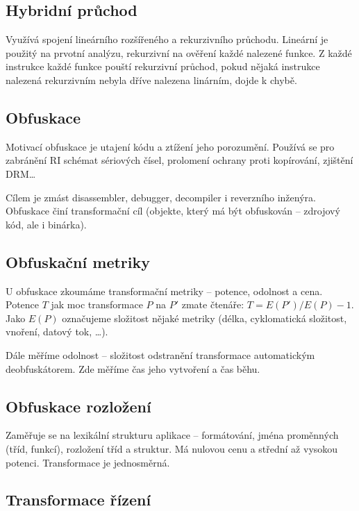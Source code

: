\subsection*{Hybridní průchod}

Využívá spojení lineárního rozšířeného a rekurzivního průchodu.
Lineární je použitý na prvotní analýzu, rekurzivní na ověření každé nalezené funkce.
Z každé instrukce každé funkce pouští rekurzivní průchod, pokud nějaká instrukce nalezená rekurzivním nebyla dříve nalezena linárním, dojde k chybě.

\subsection*{Obfuskace}

Motivací obfuskace je utajení kódu a ztížení jeho porozumění.
Používá se pro zabránění RI schémat sériových čísel, prolomení ochrany proti kopírování, zjištění DRM\dots

Cílem je zmást disassembler, debugger, decompiler i reverzního inženýra.
Obfuskace činí transformační cíl (objekte, který má být obfuskován -- zdrojový kód, ale i binárka).

\subsection*{Obfuskační metriky}

U obfuskace zkoumáme transformační metriky -- potence, odolnost a cena.
Potence $T$ jak moc transformace $P$ na $P'$ zmate čtenáře: $T = E(P')/E(P) - 1$.
Jako $E(P)$ označujeme složitost nějaké metriky (délka, cyklomatická složitost, vnoření, datový tok, \dots).

Dále měříme odolnost -- složitost odstranění transformace automatickým deobfuskátorem.
Zde měříme čas jeho vytvoření a čas běhu.

\subsection*{Obfuskace rozložení}

Zaměřuje se na lexikální strukturu aplikace -- formátování, jména proměnných (tříd, funkcí), rozložení tříd a struktur.
Má nulovou cenu a střední až vysokou potenci.
Transformace je jednosměrná.

\subsection*{Transformace řízení}

